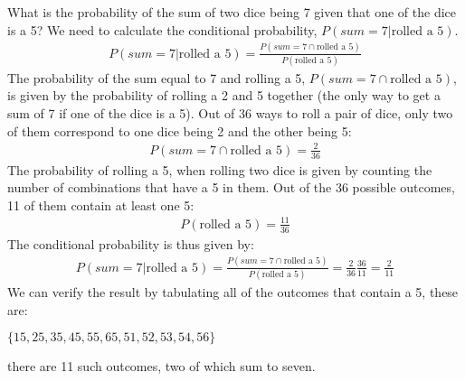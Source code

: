 \begin{example}{What is the probability of the sum of two dice being 7 given that one of the dice is a 5?}
\label{ex:ConditionalDice1}
We need to calculate the conditional probability, $P(sum=7|\text{rolled a 5})$.
\begin{align}
P(sum=7|\text{rolled a 5})=\frac{P(sum=7 \cap \text{rolled a 5})}{P(\text{rolled a 5})}
\end{align}
The probability of the sum equal to 7 and rolling a 5, $P(sum=7 \cap \text{rolled a 5})$, is given by the probability of rolling  a 2 and 5 together (the only way to get a sum of 7 if one of the dice is a 5). Out of 36 ways to roll a pair of dice, only two of them correspond to one dice being 2 and the other being 5:
\begin{align}
P(sum=7 \cap \text{rolled a 5})=\frac{2}{36}
\end{align}
The probability of rolling a 5, when rolling two dice is given by counting the number of combinations that have a 5 in them. Out of the 36 possible outcomes, 11 of them contain at least one 5:
\begin{align}
P(\text{rolled a 5})=\frac{11}{36}
\end{align}
The conditional probability is thus given by:
\begin{align}
P(sum=7|\text{rolled a 5})=\frac{P(sum=7 \cap \text{rolled a 5})}{P(\text{rolled a 5})}=\frac{2}{36}\frac{36}{11}=\frac{2}{11}
\end{align}
We can verify the result by tabulating all of the outcomes that contain a 5, these are:

 $\{15,25,35,45,55,65,51,52,53,54,56\}$
 
there are 11 such outcomes, two of which sum to seven. 
\end{example}

